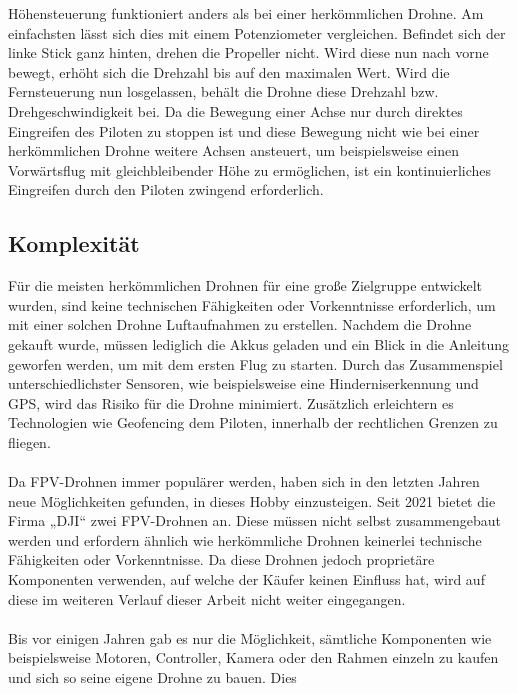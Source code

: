        Höhensteuerung funktioniert anders als bei einer herkömmlichen Drohne. Am einfachsten lässt sich dies mit
        einem Potenziometer vergleichen. Befindet sich der linke Stick ganz hinten, drehen die Propeller nicht.
        Wird diese nun nach vorne bewegt, erhöht sich die Drehzahl bis auf den maximalen Wert. Wird die Fernsteuerung
        nun losgelassen, behält die Drohne diese Drehzahl bzw. Drehgeschwindigkeit bei. Da die Bewegung einer Achse
        nur durch direktes Eingreifen des Piloten zu stoppen ist und diese Bewegung nicht wie bei einer herkömmlichen
        Drohne weitere Achsen ansteuert, um beispielsweise einen Vorwärtsflug mit gleichbleibender Höhe zu ermöglichen,
        ist ein kontinuierliches Eingreifen durch den Piloten zwingend erforderlich.

    \subsection[Komplexität]{Komplexität}
        Für die meisten herkömmlichen Drohnen für eine große Zielgruppe entwickelt wurden, sind keine technischen
        Fähigkeiten oder Vorkenntnisse erforderlich, um mit einer solchen Drohne Luftaufnahmen zu erstellen.
        Nachdem die Drohne gekauft wurde, müssen lediglich die Akkus geladen und ein Blick in die Anleitung geworfen
        werden, um mit dem ersten Flug zu starten. Durch das Zusammenspiel unterschiedlichster Sensoren, wie
        beispielsweise eine Hinderniserkennung und GPS, wird das Risiko für die Drohne minimiert. Zusätzlich
        erleichtern es Technologien wie Geofencing dem Piloten, innerhalb der rechtlichen Grenzen zu fliegen. \\
        \\
        Da FPV-Drohnen immer populärer werden, haben sich in den letzten Jahren neue Möglichkeiten gefunden, in
        dieses Hobby einzusteigen. Seit 2021 bietet die Firma „DJI“ zwei FPV-Drohnen an. Diese müssen nicht selbst
        zusammengebaut werden und erfordern ähnlich wie herkömmliche Drohnen keinerlei technische Fähigkeiten oder
        Vorkenntnisse. Da diese Drohnen jedoch proprietäre Komponenten verwenden, auf welche der Käufer keinen Einfluss
        hat, wird auf diese im weiteren Verlauf dieser Arbeit nicht weiter eingegangen. \\
        \\
        Bis vor einigen Jahren gab es nur die Möglichkeit, sämtliche Komponenten wie beispielsweise Motoren,
        Controller, Kamera oder den Rahmen einzeln zu kaufen und sich so seine eigene Drohne zu bauen. Dies
